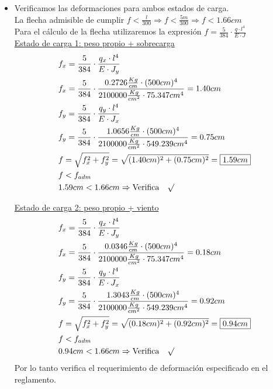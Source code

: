 \begin{enumerate}
\begin{itemize}
\item Verificamos las deformaciones para ambos estados de carga.\\
La flecha admisible de cumplir $f < \frac{l}{300} \Rightarrow f < \frac{5m}{300} \Rightarrow f < 1.66cm$\\
Para el cálculo de la flecha utilizaremos la expresión $f= \frac{5}{384} \cdot \frac{q \cdot l^4}{E \cdot J}$\\

\underline{Estado de carga 1: peso propio + sobrecarga}
\begin{align*}
& f_x=\frac{5}{384} \cdot \frac{q_x \cdot l^4}{E \cdot J_y}\\
& f_x=\frac{5}{384} \cdot \frac{0.2726 \frac{Kg}{cm} \cdot (500cm)^4}{2100000 \frac{Kg}{cm^2} \cdot 75.347 cm^4} = 1.40cm\\
& f_y=\frac{5}{384} \cdot \frac{q_y \cdot l^4}{E \cdot J_x}\\
& f_y=\frac{5}{384} \cdot \frac{1.0656 \frac{Kg}{cm} \cdot (500cm)^4}{2100000 \frac{Kg}{cm^2} \cdot 549.239 cm^4} = 0.75cm\\
& f = \sqrt{f_x^2+f_y^2} = \sqrt{(1.40cm)^2+(0.75cm)^2} = \framebox{$1.59cm$}\\
& f < f_{adm}\\
& 1.59cm < 1.66cm \Rightarrow \text{Verifica} \quad \surd
\end{align*}

\underline{Estado de carga 2: peso propio + viento}
\begin{align*}
& f_x=\frac{5}{384} \cdot \frac{q_x \cdot l^4}{E \cdot J_y}\\
& f_x=\frac{5}{384} \cdot \frac{0.0346 \frac{Kg}{cm} \cdot (500cm)^4}{2100000 \frac{Kg}{cm^2} \cdot 75.347 cm^4} = 0.18cm\\
& f_y=\frac{5}{384} \cdot \frac{q_y \cdot l^4}{E \cdot J_x}\\
& f_y=\frac{5}{384} \cdot \frac{1.3043 \frac{Kg}{cm} \cdot (500cm)^4}{2100000 \frac{Kg}{cm^2} \cdot 549.239 cm^4} = 0.92cm\\
& f = \sqrt{f_x^2+f_y^2} = \sqrt{(0.18cm)^2+(0.92cm)^2} = \framebox{$0.94cm$}\\
& f < f_{adm}\\
& 0.94cm < 1.66cm \Rightarrow \text{Verifica} \quad \surd
\end{align*}
Por lo tanto verifica el requerimiento de deformación especificado en el reglamento.\\
\end{itemize}


\end{enumerate}
